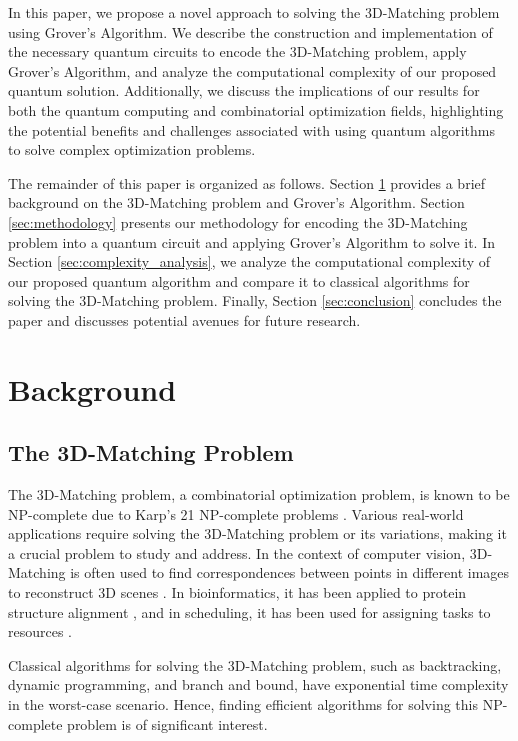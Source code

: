 In this paper, we propose a novel approach to solving the 3D-Matching problem using Grover's Algorithm. We describe the construction and implementation of the necessary quantum circuits to encode the 3D-Matching problem, apply Grover's Algorithm, and analyze the computational complexity of our proposed quantum solution. Additionally, we discuss the implications of our results for both the quantum computing and combinatorial optimization fields, highlighting the potential benefits and challenges associated with using quantum algorithms to solve complex optimization problems.

The remainder of this paper is organized as follows. Section \ref{sec:background} provides a brief background on the 3D-Matching problem and Grover's Algorithm. Section \ref{sec:methodology} presents our methodology for encoding the 3D-Matching problem into a quantum circuit and applying Grover's Algorithm to solve it. In Section \ref{sec:complexity_analysis}, we analyze the computational complexity of our proposed quantum algorithm and compare it to classical algorithms for solving the 3D-Matching problem. Finally, Section \ref{sec:conclusion} concludes the paper and discusses potential avenues for future research.

\section{Background} \label{sec:background}

\subsection{The 3D-Matching Problem}

The 3D-Matching problem, a combinatorial optimization problem, is known to be NP-complete due to Karp's 21 NP-complete problems \cite{karp}. Various real-world applications require solving the 3D-Matching problem or its variations, making it a crucial problem to study and address. In the context of computer vision, 3D-Matching is often used to find correspondences between points in different images to reconstruct 3D scenes \cite{computer_vision}. In bioinformatics, it has been applied to protein structure alignment \cite{bioinformatics}, and in scheduling, it has been used for assigning tasks to resources \cite{scheduling}.

Classical algorithms for solving the 3D-Matching problem, such as backtracking, dynamic programming, and branch and bound, have exponential time complexity in the worst-case scenario. Hence, finding efficient algorithms for solving this NP-complete problem is of significant interest.

